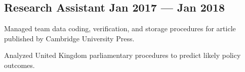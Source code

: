 \documentclass[%
               doublesided,
               paper=a4,
               fontsize=10.5pt
              ]{my-resume}
\begin{document}
{\begin{zitemize}
        
    \end{zitemize}

    \subsection{{Research Assistant \hfill Jan 2017 --- Jan 2018}}
    \begin{zitemize}
        \item{Managed team data coding, verification, and storage procedures for article \\ published by Cambridge University Press.}
        \item{Analyzed United Kingdom parliamentary procedures to predict likely policy outcomes.}
    \end{zitemize}
    
    


}
\end{document}
